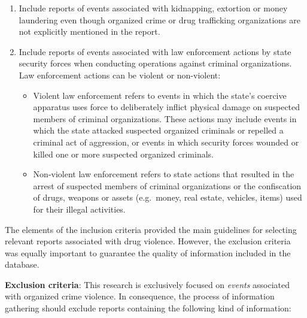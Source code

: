 \documentclass[12pt,letterpaper]{article}
\begin{document}
\begin{enumerate}
    \item Include reports of events associated with kidnapping, extortion or money laundering even though organized crime or drug trafficking organizations are not explicitly mentioned in the report. 
    \item Include reports of events associated with law enforcement actions by state security forces when conducting operations against criminal organizations. Law enforcement actions can be violent or non-violent: 
        \begin{itemize} \itemsep-0.4em
        \item Violent law enforcement refers to events in which the state's coercive apparatus uses force to deliberately inflict physical damage on suspected members of criminal organizations. These actions may include events in which the state attacked suspected organized criminals or repelled a criminal act of aggression, or events in which security forces wounded or killed one or more suspected organized criminals.
        \item Non-violent law enforcement refers to state actions that resulted in the arrest of suspected members of criminal organizations or the confiscation of drugs, weapons or assets (e.g.\ money, real estate, vehicles, items) used for their illegal activities.
        \end{itemize}
\end{enumerate}



The elements of the inclusion criteria provided the main guidelines for selecting relevant reports associated with drug violence. However, the exclusion criteria was equally important to guarantee the quality of information included in the database. 

\textbf{Exclusion criteria}: This research is exclusively focused on \emph{events} associated with organized crime violence. In consequence, the process of information gathering should exclude reports containing the following kind of information:
\end{document}
